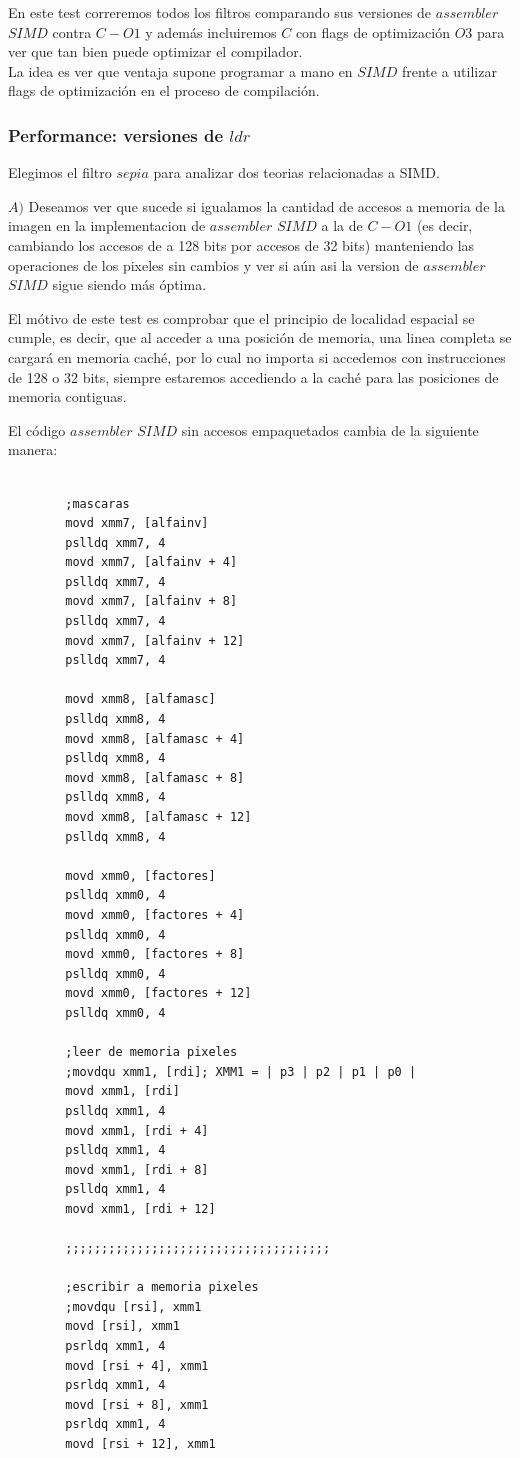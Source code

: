 En este test correremos todos los filtros comparando sus versiones de $assembler$ $SIMD$ contra $C-O1$ y además incluiremos $C$ con flags de optimización $O3$ para ver que tan bien puede optimizar el compilador. \\
La idea es ver que ventaja supone programar a mano en $SIMD$ frente a utilizar flags de optimización en el proceso de compilación.\\ 

\subsubsection{Performance: versiones de $ldr$}

Elegimos el filtro $sepia$ para analizar dos teorias relacionadas a SIMD. 

$A)$ Deseamos ver que sucede si igualamos la cantidad de accesos a memoria de la imagen en la implementacion de $assembler$ $SIMD$ a la de $C-O1$ (es decir, cambiando los accesos de a 128 bits por accesos de 32 bits) manteniendo las operaciones de los pixeles sin cambios  y ver si aún asi la version de $assembler$ $SIMD$ sigue siendo más óptima.

El mótivo de este test es comprobar que el principio de localidad espacial se cumple, es decir, que al acceder a una posición de memoria, una linea completa se cargará en memoria caché, por lo cual no importa si accedemos con instrucciones de 128 o 32 bits, siempre estaremos accediendo a la caché para las posiciones de memoria contiguas.

El código $assembler$ $SIMD$ sin accesos empaquetados cambia de la siguiente manera:

\begin{codesnippet}
\begin{verbatim}

		;mascaras
		movd xmm7, [alfainv]
 	    pslldq xmm7, 4
	    movd xmm7, [alfainv + 4]
	    pslldq xmm7, 4
	    movd xmm7, [alfainv + 8]
	    pslldq xmm7, 4
	    movd xmm7, [alfainv + 12]
	    pslldq xmm7, 4

	    movd xmm8, [alfamasc]
	    pslldq xmm8, 4
	    movd xmm8, [alfamasc + 4]
	    pslldq xmm8, 4
	    movd xmm8, [alfamasc + 8]
	    pslldq xmm8, 4
	    movd xmm8, [alfamasc + 12]
	    pslldq xmm8, 4

	    movd xmm0, [factores]
	    pslldq xmm0, 4
	    movd xmm0, [factores + 4]
	    pslldq xmm0, 4
	    movd xmm0, [factores + 8]
	    pslldq xmm0, 4
	    movd xmm0, [factores + 12]
	    pslldq xmm0, 4

		;leer de memoria pixeles
		;movdqu xmm1, [rdi]; XMM1 = | p3 | p2 | p1 | p0 |
		movd xmm1, [rdi]
		pslldq xmm1, 4
		movd xmm1, [rdi + 4]
		pslldq xmm1, 4
		movd xmm1, [rdi + 8]
		pslldq xmm1, 4
		movd xmm1, [rdi + 12]	
		
		;;;;;;;;;;;;;;;;;;;;;;;;;;;;;;;;;;;;;
		
		;escribir a memoria pixeles
		;movdqu [rsi], xmm1
		movd [rsi], xmm1
		psrldq xmm1, 4
		movd [rsi + 4], xmm1
		psrldq xmm1, 4
		movd [rsi + 8], xmm1
		psrldq xmm1, 4
		movd [rsi + 12], xmm1

\end{verbatim}
\end{codesnippet}

